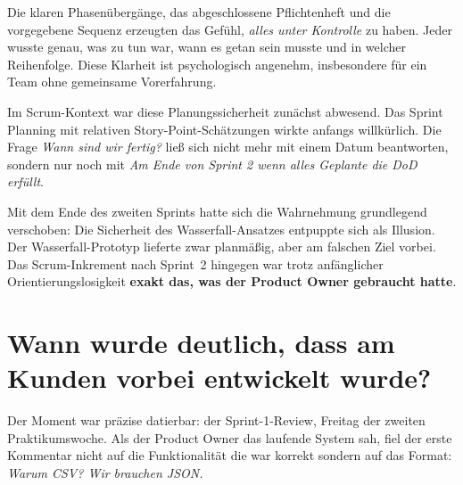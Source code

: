 \documentclass[12pt, a4paper, twoside]{report}
\begin{document}
Die klaren Phasenübergänge, das abgeschlossene Pflichtenheft und die vorgegebene Sequenz
erzeugten das Gefühl, \textit{alles unter Kontrolle} zu haben. Jeder wusste genau, was zu tun
war, wann es getan sein musste und in welcher Reihenfolge. Diese Klarheit ist psychologisch
angenehm, insbesondere für ein Team ohne gemeinsame Vorerfahrung.

Im Scrum-Kontext war diese Planungssicherheit zunächst abwesend. Das Sprint Planning
mit relativen Story-Point-Schätzungen wirkte anfangs willkürlich. Die Frage
\textit{Wann sind wir fertig?} ließ sich nicht mehr mit einem Datum beantworten, sondern
nur noch mit \textit{Am Ende von Sprint 2 \textendash{} wenn alles Geplante die DoD erfüllt}.

Mit dem Ende des zweiten Sprints hatte sich die Wahrnehmung grundlegend verschoben:
Die Sicherheit des Wasserfall-Ansatzes entpuppte sich als Illusion. Der Wasserfall-Prototyp
lieferte zwar planmäßig, aber am falschen Ziel vorbei. Das Scrum-Inkrement nach Sprint~2
hingegen war trotz anfänglicher Orientierungslosigkeit \textbf{exakt das, was der Product
Owner gebraucht hatte}.

\section{Wann wurde deutlich, dass am Kunden vorbei entwickelt wurde?}

Der Moment war präzise datierbar: der Sprint-1-Review, Freitag der zweiten
Praktikumswoche. Als der Product Owner das laufende System sah, fiel der erste Kommentar
nicht auf die Funktionalität \textendash{} die war korrekt \textendash{} sondern auf das Format: \textit{Warum
CSV? Wir brauchen JSON.}
\end{document}

